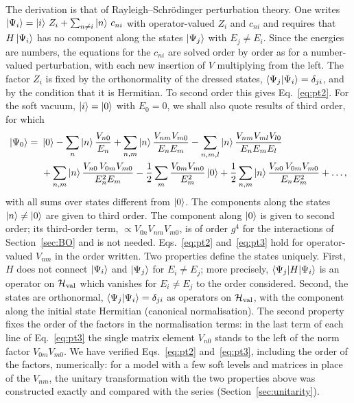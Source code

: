 The derivation is that of Rayleigh--Schr\"odinger perturbation theory. One writes $\ket{\Psi_i}=\ket i\,Z_i+\sum_{n\ne i}\ket n\,c_{ni}$ with operator-valued $Z_i$ and $c_{ni}$ and requires that $H\ket{\Psi_i}$ has no component along the states $\ket{\Psi_j}$ with $E_j\neq E_i$. Since the energies are numbers, the equations for the $c_{ni}$ are solved order by order as for a number-valued perturbation, with each new insertion of $V$ multiplying from the left. The factor $Z_i$ is fixed by the orthonormality of the dressed states, $\braket{\Psi_j|\Psi_i}=\delta_{ji}$, and by the condition that it is Hermitian. To second order this gives Eq.~\eqref{eq:pt2}. For the soft vacuum, $\ket i=\ket0$ with $E_0=0$, we shall also quote results of third order, for which
\begin{align}\label{eq:pt3}
\ket{\Psi_0}=\ &\ket0-\sum_n\ket n\frac{V_{n0}}{E_n}+\sum_{n,m}\ket n\frac{V_{nm}V_{m0}}{E_nE_m}
-\sum_{n,m,l}\ket n\frac{V_{nm}V_{ml}V_{l0}}{E_nE_mE_l}
\notag\\
&+\sum_{n,m}\ket n\frac{V_{n0}\,V_{0m}V_{m0}}{E_n^2E_m}-\frac12\sum_m\frac{V_{0m}V_{m0}}{E_m^2}\ket0
+\frac12\sum_{n,m}\ket n\frac{V_{n0}\,V_{0m}V_{m0}}{E_nE_m^2}+\dots,
\end{align}
with all sums over states different from $\ket0$. The components along the states $\ket n\neq\ket0$ are given to third order. The component along $\ket0$ is given to second order; its third-order term, $\propto V_{0n}V_{nm}V_{m0}$, is of order $g^4$ for the interactions of Section~\ref{sec:BO} and is not needed. Eqs.~\eqref{eq:pt2} and~\eqref{eq:pt3} hold for operator-valued $V_{nm}$ in the order written. Two properties define the states uniquely. First, $H$ does not connect $\ket{\Psi_i}$ and $\ket{\Psi_j}$ for $E_i\neq E_j$; more precisely, $\braket{\Psi_j|H|\Psi_i}$ is an operator on $\mathcal H_{\rm val}$ which vanishes for $E_i\ne E_j$ to the order considered. Second, the states are orthonormal, $\braket{\Psi_j|\Psi_i}=\delta_{ji}$ as operators on $\mathcal H_{\rm val}$, with the component along the initial state Hermitian (canonical normalisation). The second property fixes the order of the factors in the normalisation terms: in the last term of each line of Eq.~\eqref{eq:pt3} the single matrix element $V_{n0}$ stands to the left of the norm factor $V_{0m}V_{m0}$. We have verified Eqs.~\eqref{eq:pt2} and~\eqref{eq:pt3}, including the order of the factors, numerically: for a model with a few soft levels and matrices in place of the $V_{nm}$, the unitary transformation with the two properties above was constructed exactly and compared with the series (Section~\ref{sec:unitarity}).


